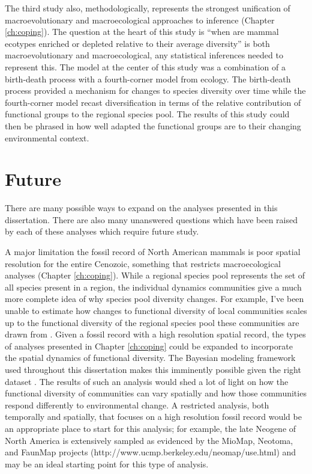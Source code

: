 The third study also, methodologically, represents the strongest unification of macroevolutionary and macroecological approaches to inference (Chapter \ref{ch:coping}). The question at the heart of this study is ``when are mammal ecotypes enriched or depleted relative to their average diversity'' is both macroevolutionary and macroecological, any statistical inferences needed to represent this. The model at the center of this study was a combination of a birth-death process with a fourth-corner model from ecology. The birth-death process provided a mechanism for changes to species diversity over time while the fourth-corner model recast diversification in terms of the relative contribution of functional groups to the regional species pool. The results of this study could then be phrased in how well adapted the functional groups are to their changing environmental context.



\section{Future}

There are many possible ways to expand on the analyses presented in this dissertation. There are also many unanswered questions which have been raised by each of these analyses which require future study.

A major limitation the fossil record of North American mammals is poor spatial resolution for the entire Cenozoic, something that restricts macroecological analyses (Chapter \ref{ch:coping}). While a regional species pool represents the set of all species present in a region, the individual dynamics communities give a much more complete idea of why species pool diversity changes. For example, I've been unable to estimate how changes to functional diversity of local communities scales up to the functional diversity of the regional species pool these communities are drawn from \citep{Harrison2008}. Given a fossil record with a high resolution spatial record, the types of analyses presented in Chapter \ref{ch:coping} could be expanded to incorporate the spatial dynamics of functional diversity. The Bayesian modeling framework used throughout this dissertation makes this imminently possible given the right dataset \citep{Banerjee2004}. The results of such an analysis would shed a lot of light on how the functional diversity of communities can vary spatially and how those communities respond differently to environmental change. A restricted analysis, both temporally and spatially, that focuses on a high resolution fossil record would be an appropriate place to start for this analysis; for example, the late Neogene of North America is extensively sampled as evidenced by the MioMap, Neotoma, and FaunMap projects (http://www.ucmp.berkeley.edu/neomap/use.html) and may be an ideal starting point for this type of analysis.

